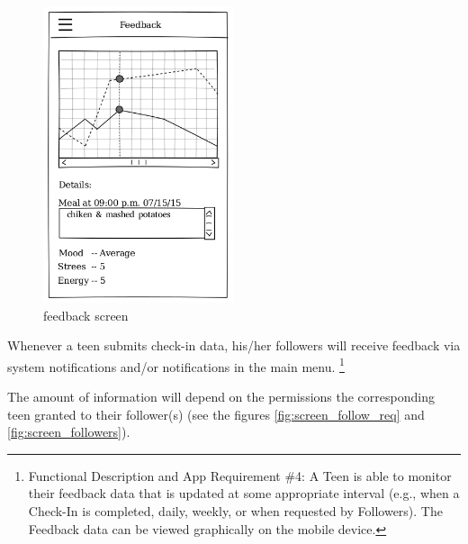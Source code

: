 \documentclass{article}
\begin{document}
    \begin{figure}[h]
        \centering
        \includegraphics[width=0.5\textwidth,height=\textheight,keepaspectratio]{feedback.png}
        \caption{feedback screen}
        \label{fig:screen_feedback}
    \end{figure}
    
    Whenever a teen submits check-in data, his/her followers will receive feedback via system notifications and/or notifications in the main menu. 
    \footnote{Functional Description and App Requirement \#4: A Teen is able to monitor their feedback data that is updated at some appropriate interval (e.g., when a Check-In is completed, daily, weekly, or when requested by Followers). The Feedback data can be viewed graphically on the mobile device.}

    The amount of information will depend on the permissions the corresponding teen granted to their follower(s) (see the figures \ref{fig:screen_follow_req} and \ref{fig:screen_followers}).
\end{document}
